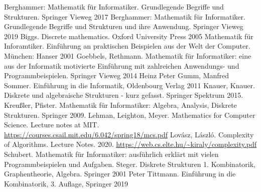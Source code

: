 \begin{thebibliography}{AAAA}
	 Berghammer: Mathematik für Informatiker. Grundlegende Begriffe und Strukturen. Springer Vieweg 2017
	 Berghammer: Mathematik für Informatiker. Grundlegende Begriffe und Strukturen und ihre Anwendung. Springer Vieweg 2019
	 Biggs. Discrete mathematics. Oxford University Press 2005
	 Mathematik für Inforamtiker. Einführung an praktischen Beispielen aus der Welt der Computer. München: Hanser 2001
	 Goebbels, Rethmann. Mathematik für Informatiker: eine aus der Informatik motivierte Einführung mit zahlreichen Anwendungs- und Programmbeispielen. Springer Vieweg 2014
	 Heinz Peter Gumm, Manfred Sommer. Einführung in die Informatik, Oldenbourg Verlag 2011
	 Knauer, Knauer. Diskrete und algebraische Strukturen - kurz gefasst. Springer Spektrum 2015. 
	 Kreußler, Pfister. Mathematik für Informatiker: Algebra, Analysis, Diskrete Strukturen. Springer 2009. 
	 Lehman, Leighton, Meyer. Mathematics for Computer Science. Lecture notes at MIT. \url{https://courses.csail.mit.edu/6.042/spring18/mcs.pdf} 
	 Lov\'asz, L\'aszl\'o. Complexity of Algorithms. Lecture Notes. 2020. \url{https://web.cs.elte.hu/~kiraly/complexity.pdf} 
	 Schubert. Mathematik für Informatiker: ausführlich erklärt mit vielen Programmbeispielen und Aufgaben.  
	 Steger. Diskrete Strukturen 1. Kombinatorik, Graphentheorie, Algebra. Springer 2001
	 Peter Tittmann. Einführung in die Kombinatorik, 3. Auflage, Springer 2019
\end{thebibliography} 
